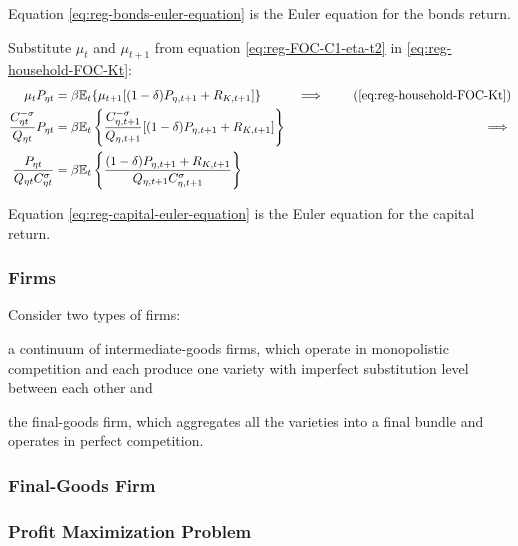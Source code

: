\documentclass[
thesis.tex
]{subfiles}
\begin{document}
Equation \ref{eq:reg-bonds-euler-equation} is the Euler equation for the bonds return.

Substitute $\mu_t$ and $\mu_{t+1}$ from equation \ref{eq:reg-FOC-C1-eta-t2} in \ref{eq:reg-household-FOC-Kt}:
\begin{alignat}{2}
	\mu_t P_{\eta t} &= \beta \mathbb{E}_t \{ \mu_{t+1} [(1-\delta) P_{\eta, t+1} + R_{K,t+1}] \} &\implies \tag{\ref{eq:reg-household-FOC-Kt}} 
	\\
	\frac{ C_{\eta t}^{-\sigma} }{ Q_{\eta t} } P_{\eta t} &= \beta \mathbb{E}_t \left\{ \frac{ C_{\eta, t+1}^{-\sigma} }{ Q_{\eta, t+1} } [(1-\delta) P_{\eta, t+1} + R_{K,t+1}] \right\} &\implies \nonumber
	\\
	\frac{ P_{\eta t} }{ Q_{\eta t} C_{\eta t}^{\sigma} }  &= \beta \mathbb{E}_t \left\{ \frac{ (1-\delta) P_{\eta, t+1} + R_{K,t+1} }{ Q_{\eta, t+1} C_{\eta, t+1}^{\sigma} } \right\} \label{eq:reg-capital-euler-equation}
\end{alignat}

Equation \ref{eq:reg-capital-euler-equation} is the Euler equation for the capital return.


\subsubsection*{Firms}

Consider two types of firms: 
\begin{enumerate*}[label=(\arabic*)]
	\item a continuum of intermediate-goods firms, which operate in monopolistic competition and each produce one variety with imperfect substitution level between each other and
	
	\item the final-goods firm, which aggregates all the varieties into a final bundle and operates in perfect competition.
\end{enumerate*}


\subsubsection{Final-Goods Firm}

\subsubsection*{Profit Maximization Problem}
\end{document}
